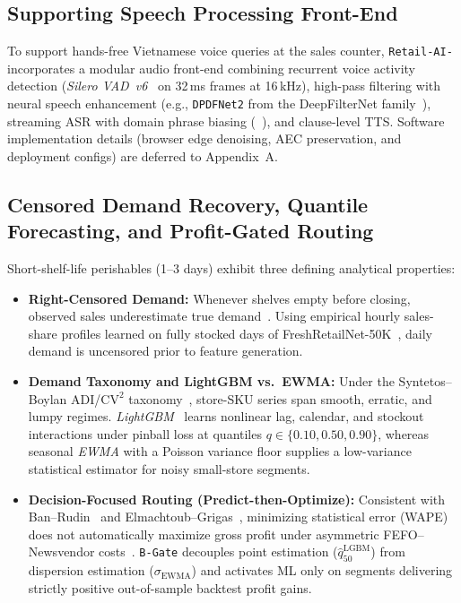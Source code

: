 \subsection*{Supporting Speech Processing Front-End}
To support hands-free Vietnamese voice queries at the sales counter, \texttt{Retail-AI-} incorporates a modular audio front-end combining recurrent voice activity detection (\emph{Silero VAD~v6}~\cite{silero_vad} on 32\,ms frames at 16\,kHz), high-pass filtering with neural speech enhancement (e.g., \texttt{DPDFNet2} from the DeepFilterNet family~\cite{schroter2022deepfilternet,sherpa_onnx}), streaming ASR with domain phrase biasing (~\cite{azure_speech}), and clause-level TTS. Software implementation details (browser edge denoising, AEC preservation, and deployment configs) are deferred to Appendix~A.

\subsection*{Censored Demand Recovery, Quantile Forecasting, and Profit-Gated Routing}
Short-shelf-life perishables (1--3 days) exhibit three defining analytical properties:
\begin{itemize}
    \item \textbf{Right-Censored Demand:} Whenever shelves empty before closing, observed sales underestimate true demand~\cite{wecker1978stockouts,vulcano2012primary}. Using empirical hourly sales-share profiles learned on fully stocked days of FreshRetailNet-50K~\cite{freshretailnet50k}, daily demand is uncensored prior to feature generation.
    \item \textbf{Demand Taxonomy and LightGBM vs.\ EWMA:} Under the Syntetos--Boylan ADI/$\text{CV}^2$ taxonomy~\cite{syntetos2005intermittent}, store-SKU series span smooth, erratic, and lumpy regimes. \emph{LightGBM}~\cite{ke2017lightgbm} learns nonlinear lag, calendar, and stockout interactions under pinball loss at quantiles $q \in \{0.10, 0.50, 0.90\}$, whereas seasonal \emph{EWMA} with a Poisson variance floor supplies a low-variance statistical estimator for noisy small-store segments.
    \item \textbf{Decision-Focused Routing (Predict-then-Optimize):} Consistent with Ban--Rudin~\cite{ban2019bigdata} and Elmachtoub--Grigas~\cite{elmachtoub2022spo}, minimizing statistical error (WAPE) does not automatically maximize gross profit under asymmetric FEFO--Newsvendor costs~\cite{nahmias2011perishable,silver2017inventory}. \texttt{B-Gate} decouples point estimation ($\hat{q}_{50}^{\text{LGBM}}$) from dispersion estimation ($\sigma_{\text{EWMA}}$) and activates ML only on segments delivering strictly positive out-of-sample backtest profit gains.
\end{itemize}

